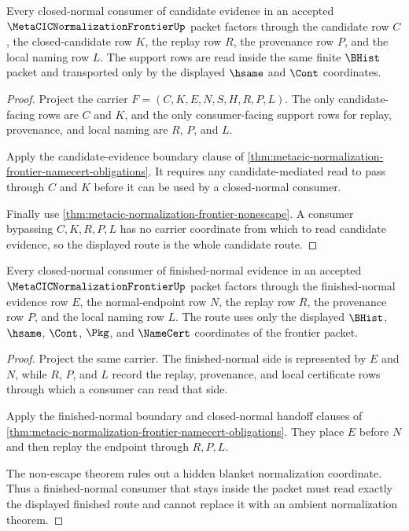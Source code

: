 \begin{theorem}
\label{thm:metacic-normalization-frontier-candidate-route}
Every closed-normal consumer of candidate evidence in an accepted $\MetaCICNormalizationFrontierUp$ packet factors through the candidate row $C$, the closed-candidate row $K$, the replay row $R$, the provenance row $P$, and the local naming row $L$. The support rows are read inside the same finite $\BHist$ packet and transported only by the displayed $\hsame$ and $\Cont$ coordinates.
\end{theorem}
\begin{proof}
Project the carrier $F=(C,K,E,N,S,H,R,P,L)$. The only candidate-facing rows are $C$ and $K$, and the only consumer-facing support rows for replay, provenance, and local naming are $R$, $P$, and $L$.

Apply the candidate-evidence boundary clause of \autoref{thm:metacic-normalization-frontier-namecert-obligations}. It requires any candidate-mediated read to pass through $C$ and $K$ before it can be used by a closed-normal consumer.

Finally use \autoref{thm:metacic-normalization-frontier-nonescape}. A consumer bypassing $C,K,R,P,L$ has no carrier coordinate from which to read candidate evidence, so the displayed route is the whole candidate route.
\end{proof}

\begin{theorem}
\label{thm:metacic-normalization-frontier-finished-route}
Every closed-normal consumer of finished-normal evidence in an accepted $\MetaCICNormalizationFrontierUp$ packet factors through the finished-normal evidence row $E$, the normal-endpoint row $N$, the replay row $R$, the provenance row $P$, and the local naming row $L$. The route uses only the displayed $\BHist$, $\hsame$, $\Cont$, $\Pkg$, and $\NameCert$ coordinates of the frontier packet.
\end{theorem}
\begin{proof}
Project the same carrier. The finished-normal side is represented by $E$ and $N$, while $R$, $P$, and $L$ record the replay, provenance, and local certificate rows through which a consumer can read that side.

Apply the finished-normal boundary and closed-normal handoff clauses of \autoref{thm:metacic-normalization-frontier-namecert-obligations}. They place $E$ before $N$ and then replay the endpoint through $R,P,L$.

The non-escape theorem rules out a hidden blanket normalization coordinate. Thus a finished-normal consumer that stays inside the packet must read exactly the displayed finished route and cannot replace it with an ambient normalization theorem.
\end{proof}

